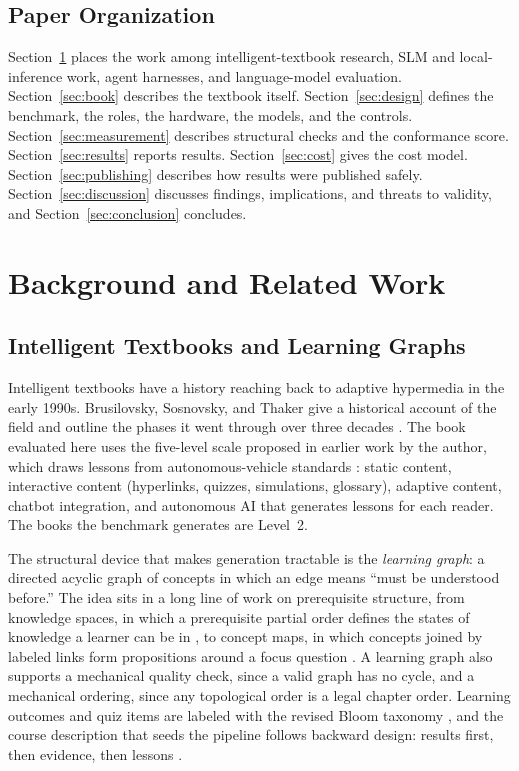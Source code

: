 \documentclass[11pt]{article}
\begin{document}
\subsection{Paper Organization}

Section~\ref{sec:related} places the work among intelligent-textbook research, SLM and local-inference work, agent harnesses, and language-model evaluation. Section~\ref{sec:book} describes the textbook itself. Section~\ref{sec:design} defines the benchmark, the roles, the hardware, the models, and the controls. Section~\ref{sec:measurement} describes structural checks and the conformance score. Section~\ref{sec:results} reports results. Section~\ref{sec:cost} gives the cost model. Section~\ref{sec:publishing} describes how results were published safely. Section~\ref{sec:discussion} discusses findings, implications, and threats to validity, and Section~\ref{sec:conclusion} concludes.

\section{Background and Related Work}
\label{sec:related}

\subsection{Intelligent Textbooks and Learning Graphs}

Intelligent textbooks have a history reaching back to adaptive hypermedia in the early 1990s. Brusilovsky, Sosnovsky, and Thaker give a historical account of the field and outline the phases it went through over three decades \cite{brusilovsky2022return}. The book evaluated here uses the five-level scale proposed in earlier work by the author, which draws lessons from autonomous-vehicle standards \cite{mccreary2025fivelevels}: static content, interactive content (hyperlinks, quizzes, simulations, glossary), adaptive content, chatbot integration, and autonomous AI that generates lessons for each reader. The books the benchmark generates are Level~2.

The structural device that makes generation tractable is the \textit{learning graph}: a directed acyclic graph of concepts in which an edge means ``must be understood before.'' The idea sits in a long line of work on prerequisite structure, from knowledge spaces, in which a prerequisite partial order defines the states of knowledge a learner can be in \cite{doignon1999knowledge}, to concept maps, in which concepts joined by labeled links form propositions around a focus question \cite{novak2008concept}. A learning graph also supports a mechanical quality check, since a valid graph has no cycle, and a mechanical ordering, since any topological order is a legal chapter order. Learning outcomes and quiz items are labeled with the revised Bloom taxonomy \cite{anderson2001taxonomy}, and the course description that seeds the pipeline follows backward design: results first, then evidence, then lessons \cite{wiggins2005ubd}.
\end{document}
